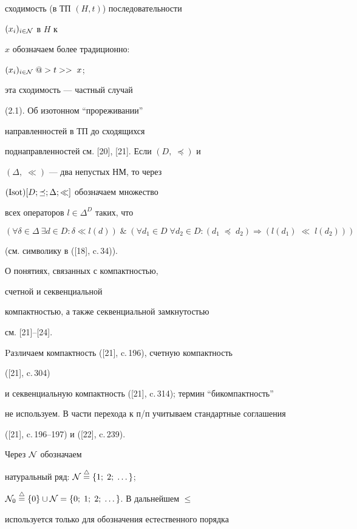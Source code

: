 сходимость (в ТП $(H,t)$) последовательности


$(x_i)_{i \in {\cal N}}$ в $H$ к


$x$ обозначаем более традиционно:


${{(x_i)_{i \in {\cal N}}}\;@>t>>\;x}$;


эта сходимость --- частный случай


(2.1). Об изотонном ``прореживании''


направленностей в ТП до сходящихся


поднаправленностей см. [20], [21]. Если $(D,\;\preceq)$ и


$(\Delta,\;\ll)$ --- два непустых НМ, то через


$(\operatorname{Isot})[D;\preceq;\Delta;\ll]$ обозначаем множество


всех операторов $l \in {{\Delta}^D}$ таких, что


$$


(\forall{\delta} \in \Delta\ \exists{d} \in D: \delta \ll l(d))\;


\&\; (\forall{d_1} \in D\; \forall{d_2} \in D:


{}({d_1}\;\preceq\;{d_2}) \Longrightarrow


({l(d_1)}\;\ll\;{l(d_2)}))


$$


(см. символику в ([18], c.\,34)).


О понятиях, связанных с компактностью,


счетной и секвенциальной


компактностью, а также секвенциальной замкнутостью


см. [21]--[24].


Pазличаем компактность ([21], c.\,196), счетную компактность


([21], c.\,304)


и секвенциальную компактность ([21], c.\,314); термин ``бикомпактность''


не используем. В части перехода к п/п учитываем стандартные соглашения


([21], c.\,196--197) и ([22], c.\,239).


Через ${\cal N}$ обозначаем


натуральный ряд: ${\cal N}\overset{\triangle}{=}{} \{1;\;2;\;\dotsc\}$;


${{\cal N}_0}\stac \{0\} \cup {\cal N} =


\{0;\;1;\;2;\;\dotsc\}$. В дальнейшем $\le$


используется только для обозначения естественного порядка


